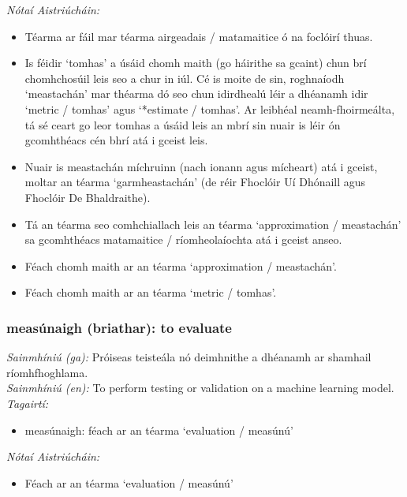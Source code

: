 \documentclass{article}
\begin{document}
 \noindent \textit{Nótaí Aistriúcháin:}
\begin{itemize}
	\item Téarma ar fáil mar téarma airgeadais / matamaitice ó na foclóirí thuas.
	\item Is féidir `tomhas' a úsáid chomh maith (go háirithe sa gcaint) chun brí chomhchosúil leis seo a chur in iúl. Cé is moite de sin, roghnaíodh `meastachán' mar théarma dó seo chun idirdhealú léir a dhéanamh idir `metric / tomhas' agus `*estimate / tomhas'. Ar leibhéal neamh-fhoirmeálta, tá sé ceart go leor tomhas a úsáid leis an mbrí sin nuair is léir ón gcomhthéacs cén bhrí atá i gceist leis.
	\item Nuair is meastachán míchruinn (nach ionann agus mícheart) atá i gceist, moltar an téarma `garmheastachán' (de réir Fhoclóir Uí Dhónaill agus Fhoclóir De  Bhaldraithe).
	\item Tá an téarma seo comhchiallach leis an téarma `approximation / meastachán' sa gcomhthéacs matamaitice / ríomheolaíochta atá i gceist anseo.
	\item Féach chomh maith ar an téarma `approximation / meastachán'.
	\item Féach chomh maith ar an téarma `metric / tomhas'.
\end{itemize}


\subsubsection*{measúnaigh (briathar): to evaluate}
 \noindent \textit{Sainmhíniú (ga):} Próiseas teisteála nó deimhnithe a dhéanamh ar shamhail ríomhfhoghlama.
\\
 \noindent \textit{Sainmhíniú (en):} To perform testing or validation on a machine learning model.
\\
 \noindent \textit{Tagairtí:}
\begin{itemize}
	\item measúnaigh: féach ar an téarma `evaluation / measúnú'
\end{itemize}

 \noindent \textit{Nótaí Aistriúcháin:}
\begin{itemize}
	\item Féach ar an téarma `evaluation / measúnú'
\end{itemize}
\end{document}
